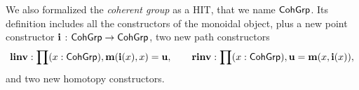 We also formalized the \emph{coherent group} \cite{baez2004groups} as
a HIT, that we name $\mathsf{CohGrp}$.  Its definition includes all the
constructors of the monoidal object, plus a new point constructor
$\operatorname{\mathbf{i}}$ : $\mathsf{CohGrp} \rightarrow \mathsf{CohGrp}$, two new path
constructors
\[
\operatorname{\mathbf{linv}} : \prod (x : \mathsf{CohGrp}) , \operatorname{\mathbf{m}}(\operatorname{\mathbf{i}}(x),x) = \operatorname{\mathbf{u}},
\quad\quad
\operatorname{\mathbf{rinv}} : \prod (x : \mathsf{CohGrp}) , \operatorname{\mathbf{u}} = \operatorname{\mathbf{m}}(x,\operatorname{\mathbf{i}}(x)),
\]
and two new homotopy constructors.

